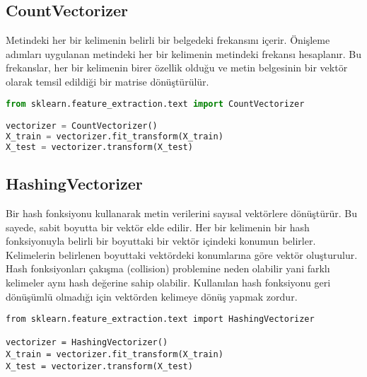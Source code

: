 \subsection{CountVectorizer}
Metindeki her bir kelimenin belirli bir belgedeki frekansını içerir. Önişleme adımları uygulanan metindeki her bir kelimenin metindeki frekansı hesaplanır. Bu frekanslar, her bir kelimenin birer özellik olduğu ve metin belgesinin bir vektör olarak temsil edildiği bir matrise dönüştürülür.

\begin{lstlisting}[language=Python, caption="Scikit-learn'de CountVectorizer kullanımı."]
from sklearn.feature_extraction.text import CountVectorizer

vectorizer = CountVectorizer()
X_train = vectorizer.fit_transform(X_train)
X_test = vectorizer.transform(X_test)
\end{lstlisting}

\subsection{HashingVectorizer}
Bir hash fonksiyonu kullanarak metin verilerini sayısal vektörlere dönüştürür. Bu sayede, sabit boyutta bir vektör elde edilir. Her bir kelimenin bir hash fonksiyonuyla belirli bir boyuttaki bir vektör içindeki konumun belirler. Kelimelerin belirlenen boyuttaki vektördeki konumlarına göre vektör oluşturulur. Hash fonksiyonları çakışma (collision) problemine neden olabilir yani farklı kelimeler aynı hash değerine sahip olabilir. Kullanılan hash fonksiyonu geri dönüşümlü olmadığı için vektörden kelimeye dönüş yapmak zordur.

\begin{lstlisting}
from sklearn.feature_extraction.text import HashingVectorizer

vectorizer = HashingVectorizer()
X_train = vectorizer.fit_transform(X_train)
X_test = vectorizer.transform(X_test)
\end{lstlisting}

\newpage